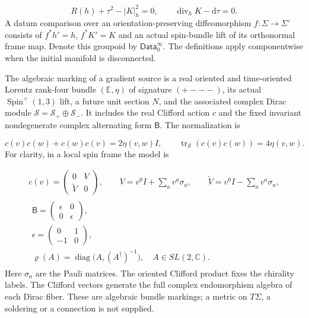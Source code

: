 \documentclass[
  english,
  11pt,
  reqno]{amsart}
\begin{document}
\label{eq:online-intrinsic-vacuum-constraints} \[
R(h)+\tau^2-|K|_h^2=0,\qquad
\operatorname{div}_hK-\mathrm d\tau=0.
\] A datum comparison over an orientation-preserving diffeomorphism
\(f:\Sigma\to\Sigma'\) consists of \(f^*h'=h\), \(f^*K'=K\) and an
actual spin-bundle lift of its orthonormal frame map. Denote this
groupoid by \(\mathsf{Data}_0^\infty\). The definitions apply
componentwise when the initial manifold is disconnected.

The algebraic marking of a gradient source is a real oriented and
time-oriented Lorentz rank-four bundle \((\mathbb E,\eta)\) of signature
\((+---)\), its actual \(\operatorname{Spin}^{+}(1,3)\) lift, a future
unit section \(N\), and the associated complex Dirac module
\(\mathscr S=\mathscr S_+\oplus\mathscr S_-\). It includes the real
Clifford action \(c\) and the fixed invariant nondegenerate complex
alternating form \(\mathsf B\). The normalization is

\label{eq:online-intrinsic-clifford-normalization} \[
c(v)c(w)+c(w)c(v)=2\eta(v,w)I,\qquad
\operatorname{tr}_{\mathscr S}(c(v)c(w))=4\eta(v,w).
\] For clarity, in a local spin frame the model is

\label{eq:online-intrinsic-dirac-model} \[
\begin{gathered}
c(v)=
\begin{pmatrix}0&V\\ \widetilde V&0\end{pmatrix},
\qquad
V=v^0I+\sum_a v^a\sigma_a,\qquad
\widetilde V=v^0I-\sum_a v^a\sigma_a, \\
\begin{gathered}
\mathsf B=
\begin{pmatrix}\epsilon&0\\0&\epsilon\end{pmatrix}, \\
\epsilon=\begin{pmatrix}0&1\\-1&0\end{pmatrix}, \\
\varrho(A)=\operatorname{diag}\bigl(A,(A^\dagger)^{-1}\bigr),
\quad A\in SL(2,\mathbb C).
\end{gathered}
\end{gathered}
\] Here \(\sigma_a\) are the Pauli matrices. The oriented Clifford
product fixes the chirality labels. The Clifford vectors generate the
full complex endomorphism algebra of each Dirac fiber. These are
algebraic bundle markings; a metric on \(T\Sigma\), a soldering or a
connection is not supplied.
\end{document}
